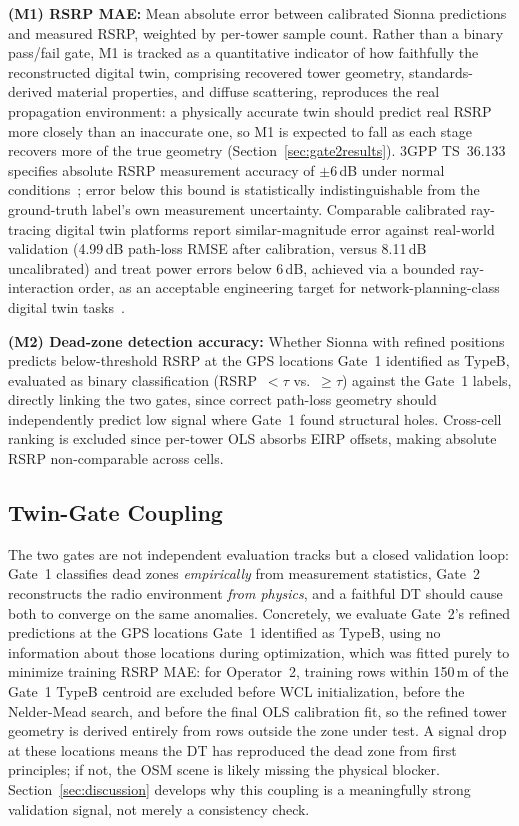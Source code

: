 \documentclass[conference]{IEEEtran}
\begin{document}
\noindent\textbf{(M1) RSRP MAE:} Mean absolute error between calibrated
Sionna predictions and measured RSRP, weighted by per-tower sample
count. Rather than a binary pass/fail gate, M1 is tracked as a
quantitative indicator of how faithfully the reconstructed digital
twin, comprising recovered tower geometry, standards-derived material
properties, and diffuse scattering, reproduces the real propagation
environment: a physically accurate twin should predict real RSRP more
closely than an inaccurate one, so M1 is expected to fall as each stage
recovers more of the true geometry (Section~\ref{sec:gate2results}).
3GPP TS~36.133 specifies absolute RSRP measurement accuracy of
$\pm$6\,dB under normal conditions~\cite{3gpp36133}; error below this
bound is statistically indistinguishable from the ground-truth label's
own measurement uncertainty. Comparable calibrated ray-tracing digital
twin platforms report similar-magnitude error against real-world
validation (4.99\,dB path-loss RMSE after calibration, versus 8.11\,dB
uncalibrated) and treat power errors below 6\,dB, achieved via a bounded
ray-interaction order, as an acceptable engineering target for
network-planning-class digital twin tasks~\cite{yu2025mart6g}.

\noindent\textbf{(M2) Dead-zone detection accuracy:} Whether Sionna
with refined positions predicts below-threshold RSRP at the GPS
locations Gate~1 identified as TypeB, evaluated as binary
classification (RSRP~$<\tau$ vs.\ $\geq\tau$) against the Gate~1
labels, directly linking the two gates, since correct path-loss
geometry should independently predict low signal where Gate~1 found
structural holes. Cross-cell ranking is excluded since per-tower OLS
absorbs EIRP offsets, making absolute RSRP non-comparable across cells.

\subsection{Twin-Gate Coupling}
\label{sec:coupling}

The two gates are not independent evaluation tracks but a closed
validation loop: Gate~1 classifies dead zones \emph{empirically} from
measurement statistics, Gate~2 reconstructs the radio environment
\emph{from physics}, and a faithful DT should cause both to converge on
the same anomalies. Concretely, we evaluate Gate~2's refined
predictions at the GPS locations Gate~1 identified as TypeB, using no
information about those locations during optimization, which was
fitted purely to minimize training RSRP MAE: for Operator~2, training
rows within 150\,m of the Gate~1 TypeB centroid are excluded before WCL
initialization, before the Nelder-Mead search, and before the final OLS
calibration fit, so the refined tower geometry is derived entirely from
rows outside the zone under test. A signal drop at these
locations means the DT has reproduced the dead zone from first
principles; if not, the OSM scene is likely missing the physical
blocker. Section~\ref{sec:discussion} develops why this coupling is a
meaningfully strong validation signal, not merely a consistency check.
\end{document}
